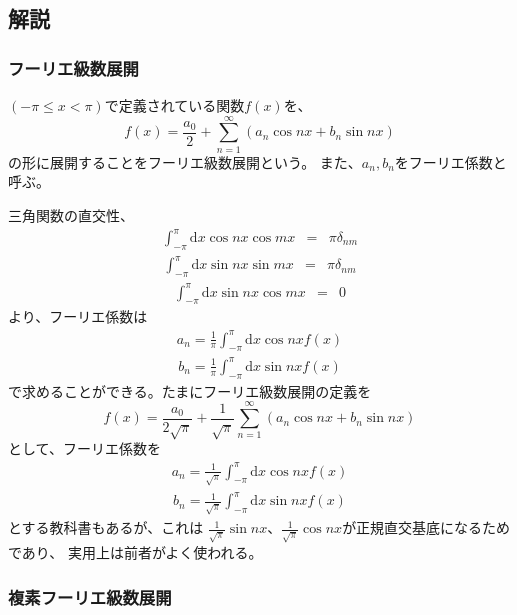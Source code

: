 \documentclass{jarticle}
\newcommand{\diff}{\mathrm d}
\begin{document}
\subsection{解説}

\subsubsection{フーリエ級数展開}

$(-\pi \le x < \pi)$で定義されている関数$f(x)$を、
$$
  f(x) = \frac{a_0}{2} + \sum_{n=1}^\infty (a_n \cos nx + b_n \sin nx)
$$
の形に展開することをフーリエ級数展開という。
また、$a_n, b_n$をフーリエ係数と呼ぶ。

三角関数の直交性、
\begin{eqnarray}
  \int_{-\pi}^{\pi} \!\!\! \diff x \cos nx \cos mx &=& \pi \delta_{nm}
\end{eqnarray}
\begin{eqnarray}
  \int_{-\pi}^{\pi} \!\!\! \diff x \sin nx \sin mx &=& \pi \delta_{nm}
\end{eqnarray}
\begin{eqnarray}
  \int_{-\pi}^{\pi} \!\!\! \diff x \sin nx \cos mx &=& 0
\end{eqnarray}
より、フーリエ係数は
\begin{eqnarray}
  a_n = \frac{1}{ \pi} \int_{-\pi}^{\pi} \!\!\! \diff x \cos nx f(x)
\end{eqnarray}
\begin{eqnarray}
  b_n = \frac{1}{ \pi} \int_{-\pi}^{\pi} \!\!\! \diff x \sin nx f(x)
\end{eqnarray}
で求めることができる。たまにフーリエ級数展開の定義を
$$
  f(x) = \frac{a_0}{2\sqrt{\pi}} + \frac{1}{\sqrt{\pi}}\sum_{n=1}^\infty (a_n \cos nx + b_n \sin nx)
$$
として、フーリエ係数を
\begin{eqnarray}
  a_n = \frac{1}{ \sqrt{\pi}} \int_{-\pi}^{\pi} \!\!\! \diff x \cos nx f(x)
\end{eqnarray}
\begin{eqnarray}
  b_n = \frac{1}{\sqrt{\pi}} \int_{-\pi}^{\pi} \!\!\! \diff x \sin nx f(x)
\end{eqnarray}
とする教科書もあるが、これは
$\displaystyle \frac{1}{\sqrt{\pi}} \sin nx$、$\displaystyle \frac{1}{\sqrt{\pi}} \cos nx$が正規直交基底になるためであり、
実用上は前者がよく使われる。

\subsubsection{複素フーリエ級数展開}
\end{document}
